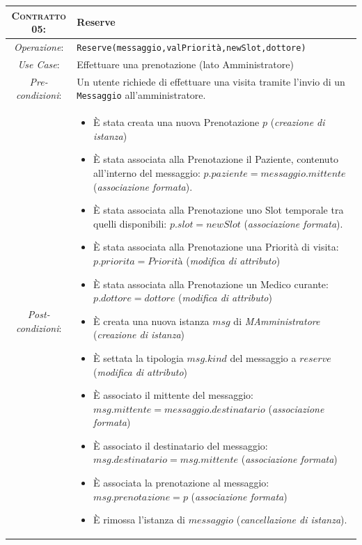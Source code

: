 \begin{tabularx}{\columnwidth}{cX}
\toprule
\textsc{Contratto 05}:& \textbf{Reserve}\\
\midrule
\textit{Operazione}: & 	\texttt{Reserve(messaggio,valPriorità,newSlot,dottore)}\\
\textit{Use Case}: &	Effettuare una prenotazione (lato Amministratore)\\
\textit{Pre-condizioni}: &  Un utente richiede di effettuare una visita tramite 
			l'invio di un \texttt{Messaggio} all'amministratore.\\
\textit{Post-condizioni}: & \begin{itemize}
\item È stata creata una nuova Prenotazione $p$ (\textit{creazione di istanza})
\item È stata associata alla Prenotazione il Paziente, contenuto all'interno del 
	messaggio: $p.paziente = messaggio.mittente$ (\textit{associazione formata}).
\item È stata associata alla Prenotazione uno Slot temporale tra quelli disponibili:
	$p.slot = newSlot$ (\textit{associazione formata}).
\item È stata associata alla Prenotazione una Priorità di visita: $p.priorita = Priorità$ (\textit{modifica di attributo})
\item È stata associata alla Prenotazione un Medico curante: $p.dottore = dottore$ (\textit{modifica di attributo})
\item È creata una nuova istanza $msg$ di \textit{MAmministratore} (\textit{creazione di istanza})
\item È settata la tipologia $msg.kind$ del messaggio a $reserve$ (\textit{modifica di attributo})
\item È associato il mittente del messaggio: $msg.mittente = 
	messaggio.destinatario$ (\textit{associazione formata})
\item È associato il destinatario del messaggio: $msg.destinatario 
	= msg.mittente$ (\textit{associazione formata})
\item È associata la prenotazione al messaggio: $msg.prenotazione = p$
	(\textit{associazione formata})
\item È rimossa l'istanza di $messaggio$ (\textit{cancellazione di istanza}). 
\end{itemize}\\
\bottomrule
\end{tabularx}
\medskip



